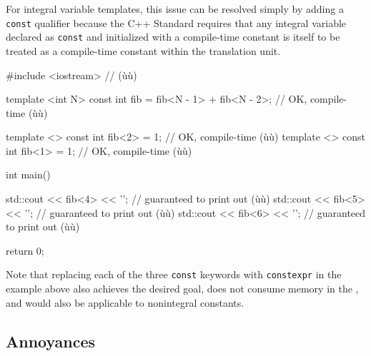 \enlargethispage*{2ex}    
\noindent For integral variable templates, this issue can be resolved simply by adding a \lstinline!const! qualifier because the C++ Standard requires that any integral variable declared as \lstinline!const! and initialized with a compile-time constant is itself to be treated as a compile-time constant within the translation unit. 

\begin{emcppslisting}
#include <iostream>  // (ù{}ù)

template <int N>
const int fib = fib<N - 1> + fib<N - 2>;  // OK, compile-time (ù{}ù)

template <> const int fib<2> = 1;         // OK, compile-time (ù{}ù)
template <> const int fib<1> = 1;         // OK, compile-time (ù{}ù)

int main()
{
    std::cout << fib<4> << '\n';  // guaranteed to print out (ù{}ù)
    std::cout << fib<5> << '\n';  // guaranteed to print out (ù{}ù)
    std::cout << fib<6> << '\n';  // guaranteed to print out (ù{}ù)

    return 0;
}
\end{emcppslisting}
    
\noindent Note that replacing each of the three \lstinline!const! keywords with
\lstinline!constexpr! in the example above also achieves the
desired goal, does not consume memory in the , and would also be applicable to nonintegral constants.

\subsection[Annoyances]{Annoyances}\label{annoyances}

